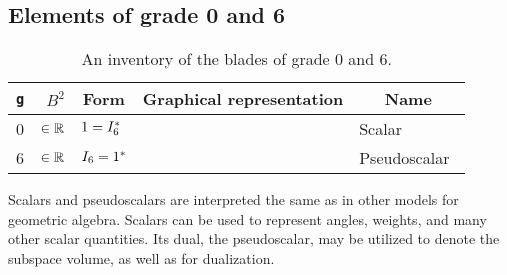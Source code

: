 
\subsection{Elements of grade 0 and 6}
\begin{table}
  \caption{An inventory of the blades of grade 0 and 6.}
  \label{tab:inv0}
  \begin{center}
    \begin{tabular}{|c|r|l|c|l|}
      \hline
      \multicolumn{1}{|c|}{\texttt{g}} & $B^2$ & \multicolumn{1}{|c|}{Form} & \multicolumn{1}{|c|}{Graphical representation} & \multicolumn{1}{|c|}{Name} \\ \hline
      \hline
      0 & $\in \mathbb{R}$ & $1 = I_6^\ast$ & & Scalar~\cite{TheBook} \\ \hline
      6 & $\in \mathbb{R}$ & $I_6 = 1^\ast$ & & Pseudoscalar~\cite{TheBook} \\ \hline
    \end{tabular}
  \end{center}
\end{table}

Scalars and pseudoscalars are interpreted the same as in other models for geometric algebra.  Scalars can be used to represent angles, weights, and many other scalar quantities.  Its dual, the pseudoscalar, may be utilized to denote the subspace volume, as well as for dualization.



